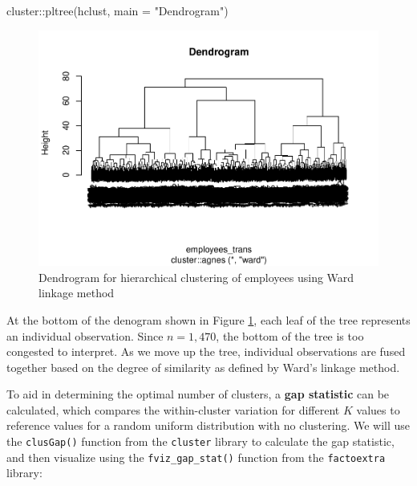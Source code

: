 \documentclass[
]{book}
\newenvironment{Shaded}{\begin{snugshade}}{\end{snugshade}}
\newcommand{\AttributeTok}[1]{\textcolor[rgb]{0.77,0.63,0.00}{#1}}
\newcommand{\FunctionTok}[1]{\textcolor[rgb]{0.00,0.00,0.00}{#1}}
\newcommand{\NormalTok}[1]{#1}
\newcommand{\SpecialCharTok}[1]{\textcolor[rgb]{0.00,0.00,0.00}{#1}}
\newcommand{\StringTok}[1]{\textcolor[rgb]{0.31,0.60,0.02}{#1}}
\begin{document}
\begin{Shaded}
\begin{Highlighting}[]
\NormalTok{cluster}\SpecialCharTok{::}\FunctionTok{pltree}\NormalTok{(hclust, }\AttributeTok{main =} \StringTok{"Dendrogram"}\NormalTok{)}
\end{Highlighting}
\end{Shaded}

\begin{figure}

{\centering \includegraphics[width=1\linewidth]{The_Fundamentals_of_People_Analytics_files/figure-latex/hclust-dendrogram-1} 

}

\caption{Dendrogram for hierarchical clustering of employees using Ward linkage method}\label{fig:hclust-dendrogram}
\end{figure}

At the bottom of the denogram shown in Figure \ref{fig:hclust-dendrogram}, each leaf of the tree represents an individual observation. Since \(n = 1,470\), the bottom of the tree is too congested to interpret. As we move up the tree, individual observations are fused together based on the degree of similarity as defined by Ward's linkage method.

To aid in determining the optimal number of clusters, a \textbf{gap statistic} can be calculated, which compares the within-cluster variation for different \(K\) values to reference values for a random uniform distribution with no clustering. We will use the \texttt{clusGap()} function from the \texttt{cluster} library to calculate the gap statistic, and then visualize using the \texttt{fviz\_gap\_stat()} function from the \texttt{factoextra} library:
\end{document}

